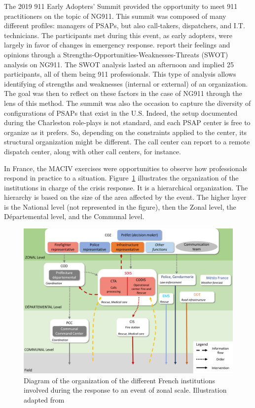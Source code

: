 The 2019 911 Early Adopters' Summit provided the opportunity to meet 911 practitioners on the topic of NG911.
This summit was composed of many different profiles: managers of PSAPs, but also call-takers, dispatchers, and I.T. technicians.
The participants met during this event, as early adopters, were largely in favor of changes in emergency response.
\textcite{graceCommunicatingNextGeneration9112020} report their feelings and opinions through a Strengths-Opportunities-Weaknesses-Threats (SWOT) analysis \parencite{gaoConsolidatingSWOTAnalysis2011} on NG911.
The SWOT analysis lasted an afternoon and implied 25 participants, all of them being 911 professionals.
This type of analysis allows identifying of strengths and weaknesses (internal or external) of an organization.
The goal was then to reflect on these factors in the case of NG911 through the lens of this method.
The summit was also the occasion to capture the diversity of configurations of PSAPs that exist in the U.S.
Indeed, the setup documented during the Charleston role-plays is not standard, and each PSAP center is free to organize as it prefers.
So, depending on the constraints applied to the center, its structural organization might be different.
The call center can report to a remote dispatch center, along with other call centers, for instance.

In France, the MACIV exercises were opportunities to observe how professionals respond in practice to a situation.
Figure~\ref{information:french-orga} illustrates the organization of the institutions in charge of the crisis response.
It is a hierarchical organization.
The hierarchy is based on the size of the area affected by the event.
The higher layer is the National level (not represented in the figure), then the Zonal level, the Départemental level, and the Communal level.

\begin{figure}[htb]
    \centering
    \includegraphics[width=\textwidth]{figures/chap-3/orga-gestion-crise.pdf}
    \caption{Diagram of the organization of the different French institutions involved during the response to an event of zonal scale. Illustration adapted from \textcite{batardIntegrerContributionsCitoyennes2021}}
    \label{information:french-orga}
\end{figure}

